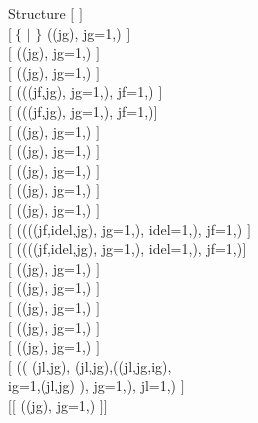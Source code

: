 \begin{DataStructure}{Structure }
 $[$  $]$ \\
\hskip 1.0cm $[~\{$  $|$  $\}$ ((jg),    jg=1,) $]$ \\
\hskip 1.0cm $[$  ((jg),    jg=1,) $]$ \\
\hskip 1.0cm $[$  ((jg),    jg=1,) $]$ \\
\hskip 1.0cm $[$  (((jf,jg), jg=1,), jf=1,) $]$ \\
\hskip 1.0cm $[$     (((jf,jg),    jg=1,), jf=1,)$]$ \\
\hskip 1.0cm $[$    ((jg),    jg=1,) $]$ \\
\hskip 1.0cm $[$    ((jg),    jg=1,) $]$ \\
\hskip 1.0cm $[$  ((jg), jg=1,) $]$ \\
\hskip 1.0cm $[$  ((jg), jg=1,) $]$ \\
\hskip 1.0cm $[$  ((jg), jg=1,) $]$ \\
\hskip 1.0cm $[$  ((((jf,idel,jg), jg=1,), idel=1,), jf=1,) $]$ \\
\hskip 1.0cm $[$    ((((jf,idel,jg), jg=1,), idel=1,), jf=1,)$]$ \\
\hskip 1.0cm $[$  ((jg), jg=1,) $]$ \\
\hskip 1.0cm $[$  ((jg), jg=1,) $]$ \\
\hskip 1.0cm $[$  ((jg), jg=1,) $]$ \\
\hskip 1.0cm $[$  ((jg), jg=1,) $]$ \\
\hskip 1.0cm $[$    ((jg),    jg=1,) $]$ \\
\hskip 1.0cm $[$  (( 
    (jl,jg), (jl,jg),((jl,jg,ig), \\
\hskip 2.0cm     ig=1,(jl,jg) ), jg=1,), jl=1,) $]$ \\
\hskip 1.0cm $[[$    ((jg),    jg=1,) $]]$
\end{DataStructure}

